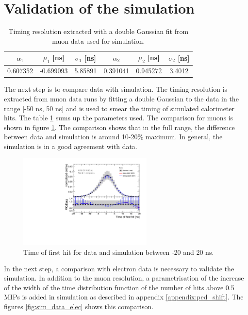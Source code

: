 \section{Validation of the simulation}

\begin{table}[htb!]
	\centering
	\caption{Timing resolution extracted with a double Gaussian fit from muon data used for simulation.}
	\label{table:time_res_sim}
	\begin{tabular}{@{} cccccc @{}}
		\hline
		$\alpha_{1}$ & $\mu_{1}$ [ns] & $\sigma_{1}$ [ns] & $\alpha_{2}$ & $\mu_{2}$ [ns] & $\sigma_{2}$ [ns] \\
		\hline
		0.607352 & -0.699093 & 5.85891 & 0.391041 & 0.945272 & 3.4012 \\
		\hline
	\end{tabular}
\end{table}

The next step is to compare data with simulation. The timing resolution is extracted from muon data runs by fitting a double Gaussian to the data in the range [-50 ns, 50 ns] and is used to smear the timing of simulated calorimeter hits. The table \ref{table:time_res_sim} sums up the parameters used. The comparison for muons is shown in figure \ref{fig:sim_data_muon}. The comparison shows that in the full range, the difference between data and simulation is around 10-20\% maximum. In general, the simulation is in a good agreement with data.

\begin{figure}[htbp!]
	\centering
	\includegraphics[width=0.6\textwidth]{chap5/fig_AHCAL_timing/Muons/Comparison_MokkaDD4hepData_Muons.pdf}
	\caption{Time of first hit for data and simulation between -20 and 20 ns.}
	\label{fig:sim_data_muon}
\end{figure}

In the next step, a comparison with electron data is necessary to validate the simulation. In addition to the muon resolution, a parametrisation of the increase of the width of the time distribution function of the number of hits above 0.5 MIPs is added in simulation as described in appendix \ref{appendix:ped_shift}. The figures \ref{fig:sim_data_elec} shows this comparison.

